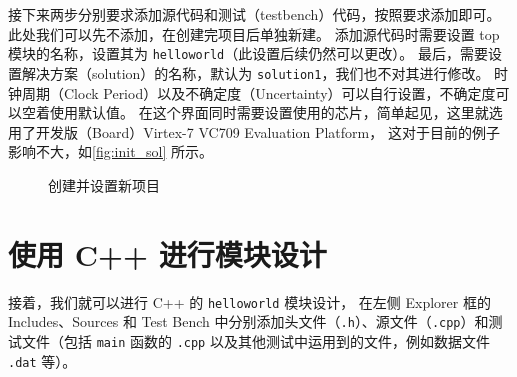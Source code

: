 \documentclass[Chinese,TC,use boldface,simple name]{beaulivre}
\begin{document}
    接下来两步分别要求添加源代码和测试（testbench）代码，按照要求添加即可。
    此处我们可以先不添加，在创建完项目后单独新建。
    添加源代码时需要设置 top 模块的名称，设置其为 \texttt{helloworld}（此设置后续仍然可以更改）。
    最后，需要设置解决方案（solution）的名称，默认为 \texttt{solution1}，我们也不对其进行修改。
    时钟周期（Clock Period）以及不确定度（Uncertainty）可以自行设置，不确定度可以空着使用默认值。
    在这个界面同时需要设置使用的芯片，简单起见，这里就选用了开发版（Board）Virtex-7 VC709 Evaluation Platform，
    这对于目前的例子影响不大，如\cref{fig:init_sol} 所示。
    \begin{figure}[h!]
      \centering
      \quad
      \caption{创建并设置新项目}
    \end{figure}

  \section{使用 C++ 进行模块设计}

    接着，我们就可以进行 C++ 的 \texttt{helloworld} 模块设计，
    在左侧 Explorer 框的 Includes、Sources 和 Test Bench 中分别添加头文件（\texttt{.h}）、源文件（\texttt{.cpp}）和测试文件（包括 \texttt{main} 函数的 \texttt{.cpp} 以及其他测试中运用到的文件，例如数据文件 \texttt{.dat} 等）。
    
\end{document}

